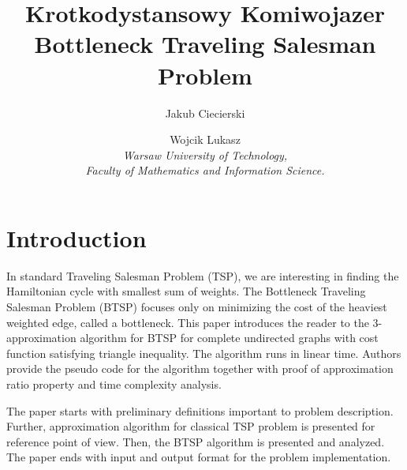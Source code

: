 \documentclass[runningheads, a4paper]{llncs}
\begin{document}
    
\mainmatter  %

\title{Krotkodystansowy Komiwojazer \\ Bottleneck Traveling Salesman Problem}


\author{Jakub Ciecierski \and Wojcik Lukasz \\ 
    \textit{Warsaw University of Technology, \\
        Faculty of Mathematics and Information Science.}}
%


\maketitle
        
        
        
        
        
\section{Introduction}
In standard Traveling Salesman Problem (TSP), we are interesting in finding the Hamiltonian cycle with smallest sum of weights. The Bottleneck Traveling Salesman Problem (BTSP) focuses only on minimizing the cost of the heaviest weighted edge, called a bottleneck. This paper introduces the reader to the 3-approximation algorithm for BTSP for complete undirected graphs with cost function satisfying triangle inequality. The algorithm runs in linear time. Authors provide the pseudo code for the algorithm together with proof of approximation ratio property and time complexity analysis.

The paper starts with preliminary definitions important to problem description. Further, approximation algorithm for classical TSP problem is presented for reference point of view. Then, the BTSP algorithm is presented and analyzed. The paper ends with input and output format for the problem implementation.

\end{document}
